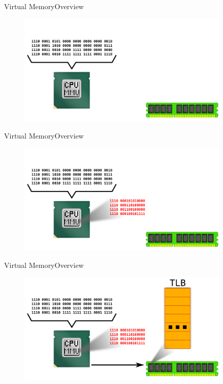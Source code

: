 \documentclass[10pt]{beamer}
\begin{document}
\begin{frame}{Virtual Memory}{Overview}
  \begin{figure}[ht]
    \centering
    \includegraphics[width=0.9\textwidth, keepaspectratio=true]{images/mmu_a.png}
  \end{figure}
\end{frame}

\begin{frame}{Virtual Memory}{Overview}
  \begin{figure}[ht]
    \centering
    \includegraphics[width=0.9\textwidth, keepaspectratio=true]{images/mmu_b.png}
  \end{figure}
\end{frame}

\begin{frame}{Virtual Memory}{Overview}
  \begin{figure}[ht]
    \centering
    \includegraphics[width=0.9\textwidth, keepaspectratio=true]{images/mmu_c.png}
  \end{figure}
\end{frame}
\end{document}

